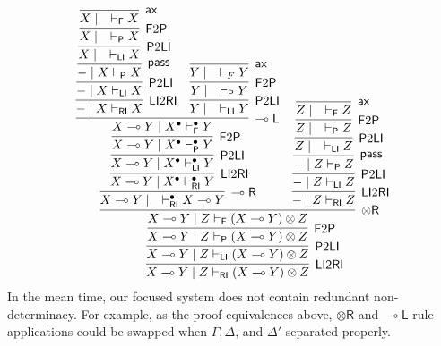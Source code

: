\documentclass[submission,copyright,creativecommons]{eptcs}
\newcommand{\tr}{\otimes \mathsf{R}}
\newcommand{\lright}{\multimap \mathsf{R}}
\newcommand{\lleft}{\multimap \mathsf{L}}
\newcommand{\pass}{\mathsf{pass}}
\newcommand{\ax}{\mathsf{ax}}
\newcommand{\lolli}{\multimap}
\newcommand{\RI}{\mathsf{RI}}
\newcommand{\LI}{\mathsf{LI}}
\newcommand{\Pass}{\mathsf{P}}
\newcommand{\F}{\mathsf{F}}
\begin{document}
\begin{displaymath}
  \infer[\mathsf{\LI 2 \RI}]{X \multimap Y \mid Z \vdash_{\mathsf{RI}} (X\multimap Y) \otimes Z}{
    \infer[\Pass 2 \LI]{X \multimap Y \mid Z \vdash_{\mathsf{LI}} (X\multimap Y) \otimes Z}{
      \infer[\F 2 \Pass]{X \multimap Y \mid Z \vdash_{\Pass} (X\multimap Y) \otimes Z}{
        \infer[\tr]{X \multimap Y \mid Z \vdash_{\F} (X\multimap Y) \otimes Z}{
          \infer[\lright]{X \lolli Y \mid \quad \vdash^{\bullet}_{\RI} X \lolli Y}{
            \infer[\LI 2 \RI]{X \lolli Y \mid X^{\bullet} \vdash^{\bullet}_{\RI} Y}{
              \infer[\Pass 2 \LI]{X \lolli Y \mid X^{\bullet} \vdash^{\bullet}_{\LI} Y}{
                \infer[\F 2 \Pass]{X \lolli Y \mid X^{\bullet} \vdash^{\bullet}_{\Pass} Y}{
                  \infer[\lleft]{X \lolli Y \mid X^{\bullet} \vdash^{\bullet}_{\F} Y}{
                    \infer[\LI 2 \RI]{- \mid X \vdash_{\RI} X}{
                      \infer[\Pass 2 \LI]{- \mid X \vdash_{\LI} X}{
                        \infer[\pass]{- \mid X \vdash_{\Pass} X}{
                          \infer[\Pass 2 \LI]{X \mid \quad \vdash_{\LI} X}{
                            \infer[\F 2 \Pass]{X \mid \quad \vdash_{\Pass} X}{
                              \infer[\ax]{X \mid \quad \vdash_{\F} X}{}
                            }
                          }
                        }
                      }
                    }
                    &
                    \infer[\Pass 2 \LI]{Y \mid \quad \vdash_{\LI} Y}{
                    \infer[\F 2 \Pass]{Y \mid \quad \vdash_{\Pass} Y}{
                    \infer[\ax]{Y \mid \quad \vdash_{F} Y}{}
                    }
                      }
                    }
                  }
                }
              }
            }
            &
                \infer[\LI 2 \RI]{- \mid Z \vdash_{\RI} Z}{
                  \infer[\Pass 2 \LI]{- \mid Z \vdash_{\LI} Z}{
                    \infer[\pass]{- \mid Z \vdash_{\Pass} Z}{
                      \infer[\Pass 2 \LI]{Z \mid \quad \vdash_{\LI} Z}{
                        \infer[\F 2 \Pass]{Z \mid \quad \vdash_{\Pass} Z}{
                          \infer[\ax]{Z \mid \quad \vdash_{\F} Z}{}
                        }
                      }
                    }
                  }
                }
          }
              }
            }
          }
\end{displaymath}
In the mean time, our focused system does not contain redundant non-determinacy.
For example, as the proof equivalences above, $\tr$ and $\lleft$ rule applications could be swapped when $\Gamma, \Delta$, and $\Delta'$ separated properly.
\end{document}
